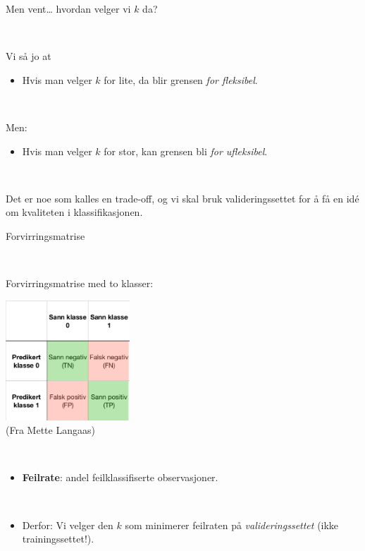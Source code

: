 \documentclass[10pt,ignorenonframetext,]{beamer}
\providecommand{\tightlist}{%
  \setlength{\itemsep}{0pt}\setlength{\parskip}{0pt}}
\begin{document}
\begin{frame}

\begin{block}{Men vent\ldots{} hvordan velger vi \(k\) da?}

\(~\)

Vi så jo at

\begin{itemize}
\tightlist
\item
  Hvis man velger \(k\) for lite, da blir grensen \emph{for fleksibel}.
\end{itemize}

\(~\)

Men:

\begin{itemize}
\tightlist
\item
  Hvis man velger \(k\) for stor, kan grensen bli \emph{for ufleksibel}.
\end{itemize}

\(~\)

Det er noe som kalles en trade-off, og vi skal bruk valideringssettet
for å få en idé om kvaliteten i klassifikasjonen.

\end{block}

\end{frame}

\begin{frame}

\begin{block}{Forvirringsmatrise}

\(~\)

Forvirringsmatrise med to klasser:

\centering

\includegraphics[width=0.35\textwidth,height=\textheight]{forvirringsmatrise.png}\\
\scriptsize (Fra Mette Langaas)

\normalsize

\(~\)

\flushleft

\begin{itemize}
\tightlist
\item
  \textbf{Feilrate}: andel feilklassifiserte observasjoner.
\end{itemize}

\(~\)

\begin{itemize}
\tightlist
\item
  Derfor: Vi velger den \(k\) som minimerer feilraten på
  \emph{valideringssettet} (ikke trainingssettet!).
\end{itemize}

\end{block}

\end{frame}
\end{document}
